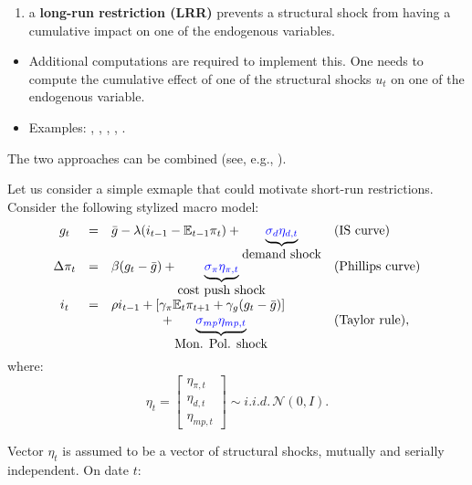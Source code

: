 \documentclass[
]{book}
\providecommand{\tightlist}{%
  \setlength{\itemsep}{0pt}\setlength{\parskip}{0pt}}
\theoremstyle{definition}
\theoremstyle{definition}
\theoremstyle{definition}
\theoremstyle{definition}
\theoremstyle{remark}
\begin{document}
\begin{enumerate}
\def\labelenumi{\arabic{enumi}.}
\setcounter{enumi}{1}
\tightlist
\item
  a \textbf{long-run restriction (LRR)} prevents a structural shock from having a cumulative impact on one of the endogenous variables.
\end{enumerate}

\begin{itemize}
\tightlist
\item
  Additional computations are required to implement this. One needs to compute the cumulative effect of one of the structural shocks \(u_{t}\) on one of the endogenous variable.
\item
  Examples: \citet{Blanchard_Quah_1989}, \citet{Faust_Leeper_1997}, \citet{Gali_1999}, \citet{Erceg_et_al_2005}, \citet{NBERc11177}.
\end{itemize}

The two approaches can be combined (see, e.g., \citet{Gerlach_Smets_1995}).

Let us consider a simple exmaple that could motivate short-run restrictions. Consider the following stylized macro model:
\begin{equation}
\begin{array}{clll}
g_{t}&=& \bar{g}-\lambda(i_{t-1}-\mathbb{E}_{t-1}\pi_{t})+ \underbrace{{\color{blue}\sigma_d \eta_{d,t}}}_{\mbox{demand shock}}& (\mbox{IS curve})\\
\Delta \pi_{t} & = & \beta (g_{t} - \bar{g})+ \underbrace{{\color{blue}\sigma_{\pi} \eta_{\pi,t}}}_{\mbox{cost push shock}} & (\mbox{Phillips curve})\\
i_{t} & = & \rho i_{t-1} + \left[ \gamma_\pi \mathbb{E}_{t}\pi_{t+1}  + \gamma_g (g_{t} - \bar{g}) \right]\\
&& \qquad \qquad+\underbrace{{\color{blue}\sigma_{mp} \eta_{mp,t}}}_{\mbox{Mon. Pol. shock}} & (\mbox{Taylor rule}),
\end{array}\label{eq:systemI}
\end{equation}
where:
\begin{equation}
\eta_t = 
\left[
\begin{array}{c}
\eta_{\pi,t}\\
\eta_{d,t}\\
\eta_{mp,t}
\end{array}
\right]
\sim i.i.d.\,\mathcal{N}(0,I).\label{eq:covU}
\end{equation}

Vector \(\eta_t\) is assumed to be a vector of structural shocks, mutually and serially independent. On date \(t\):
\end{document}
